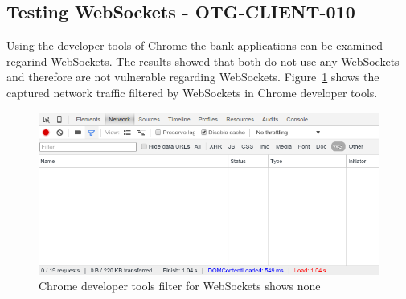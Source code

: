 \subsection{Testing WebSockets - OTG-CLIENT-010}
Using the developer tools of Chrome the bank applications can be examined regarind WebSockets. The results showed that both do not use any WebSockets and therefore are not vulnerable regarding WebSockets. Figure~\ref{fig:websockets} shows the captured network traffic filtered by WebSockets in Chrome developer tools.

\begin{figure}[ht]
	\centering
	\includegraphics[width=.8\linewidth]{figures/OTG-CLIENT-010.png}
	\caption{Chrome developer tools filter for WebSockets shows none}
	\label{fig:websockets}
\end{figure}
\clearpage